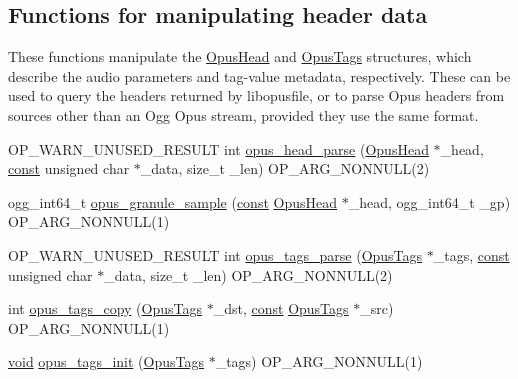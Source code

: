 \subsection*{Functions for manipulating header data}
\label{_amgrp14ef5f819e97c870c128539ed1f334e3}%
These functions manipulate the \hyperlink{struct_opus_head}{Opus\+Head} and \hyperlink{struct_opus_tags}{Opus\+Tags} structures, which describe the audio parameters and tag-\/value metadata, respectively. These can be used to query the headers returned by {\ttfamily libopusfile}, or to parse Opus headers from sources other than an Ogg Opus stream, provided they use the same format. \begin{DoxyCompactItemize}
\item 
O\+P\+\_\+\+W\+A\+R\+N\+\_\+\+U\+N\+U\+S\+E\+D\+\_\+\+R\+E\+S\+U\+LT int \hyperlink{group__header__info_gac3259b44ac8dfac93c7adf708de96d78}{opus\+\_\+head\+\_\+parse} (\hyperlink{struct_opus_head}{Opus\+Head} $\ast$\+\_\+head, \hyperlink{zconf_8h_a2c212835823e3c54a8ab6d95c652660e}{const} unsigned char $\ast$\+\_\+data, size\+\_\+t \+\_\+len) O\+P\+\_\+\+A\+R\+G\+\_\+\+N\+O\+N\+N\+U\+LL(2)
\item 
ogg\+\_\+int64\+\_\+t \hyperlink{group__header__info_gaac9c6e1916fba6e53152b936055d3db0}{opus\+\_\+granule\+\_\+sample} (\hyperlink{zconf_8h_a2c212835823e3c54a8ab6d95c652660e}{const} \hyperlink{struct_opus_head}{Opus\+Head} $\ast$\+\_\+head, ogg\+\_\+int64\+\_\+t \+\_\+gp) O\+P\+\_\+\+A\+R\+G\+\_\+\+N\+O\+N\+N\+U\+LL(1)
\item 
O\+P\+\_\+\+W\+A\+R\+N\+\_\+\+U\+N\+U\+S\+E\+D\+\_\+\+R\+E\+S\+U\+LT int \hyperlink{group__header__info_gaed7c41a177cc7338ffec1e7ae57c59b1}{opus\+\_\+tags\+\_\+parse} (\hyperlink{struct_opus_tags}{Opus\+Tags} $\ast$\+\_\+tags, \hyperlink{zconf_8h_a2c212835823e3c54a8ab6d95c652660e}{const} unsigned char $\ast$\+\_\+data, size\+\_\+t \+\_\+len) O\+P\+\_\+\+A\+R\+G\+\_\+\+N\+O\+N\+N\+U\+LL(2)
\item 
int \hyperlink{group__header__info_gaceda528fa8f9f9ad1443df2eeeeaa8bf}{opus\+\_\+tags\+\_\+copy} (\hyperlink{struct_opus_tags}{Opus\+Tags} $\ast$\+\_\+dst, \hyperlink{zconf_8h_a2c212835823e3c54a8ab6d95c652660e}{const} \hyperlink{struct_opus_tags}{Opus\+Tags} $\ast$\+\_\+src) O\+P\+\_\+\+A\+R\+G\+\_\+\+N\+O\+N\+N\+U\+LL(1)
\item 
\hyperlink{png_8h_ac9c84fa68bbad002983e35ce3663c686}{void} \hyperlink{group__header__info_ga35f993f5a8f11337a6503a2f43996fea}{opus\+\_\+tags\+\_\+init} (\hyperlink{struct_opus_tags}{Opus\+Tags} $\ast$\+\_\+tags) O\+P\+\_\+\+A\+R\+G\+\_\+\+N\+O\+N\+N\+U\+LL(1)

\end{DoxyCompactItemize}
